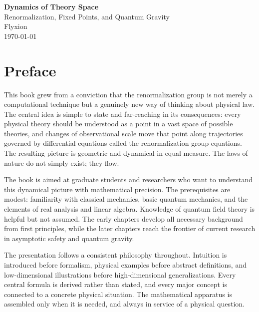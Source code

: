 \documentclass[11pt, twoside, openright]{book}
\theoremstyle{dotted}
\theoremstyle{definition}
\begin{document}
\frontmatter
\begin{titlepage}
  \centering
  \vspace*{3cm}
  {\sffamily\Huge\bfseries\color{themeblue} Dynamics of Theory Space}\\[1.2em]
  {\sffamily\Large\color{midblue}
    Renormalization, Fixed Points, and Quantum Gravity}\\[3cm]
  {\large Flyxion}\\[1em]
  \vfill
  {\small\sffamily \today}
\end{titlepage}

\chapter*{Preface}

This book grew from a conviction that the renormalization group is not merely a
computational technique but a genuinely new way of thinking about physical law.
The central idea is simple to state and far-reaching in its consequences: every
physical theory should be understood as a point in a vast space of possible
theories, and changes of observational scale move that point along trajectories
governed by differential equations called the renormalization group equations.
The resulting picture is geometric and dynamical in equal measure. The laws of
nature do not simply exist; they flow.

The book is aimed at graduate students and researchers who want to understand
this dynamical picture with mathematical precision. The prerequisites are modest:
familiarity with classical mechanics, basic quantum mechanics, and the elements of
real analysis and linear algebra. Knowledge of quantum field theory is helpful but
not assumed. The early chapters develop all necessary background from first
principles, while the later chapters reach the frontier of current research in
asymptotic safety and quantum gravity.

The presentation follows a consistent philosophy throughout. Intuition is
introduced before formalism, physical examples before abstract definitions, and
low-dimensional illustrations before high-dimensional generalizations. Every
central formula is derived rather than stated, and every major concept is connected
to a concrete physical situation. The mathematical apparatus is assembled only when
it is needed, and always in service of a physical question.
\end{document}
